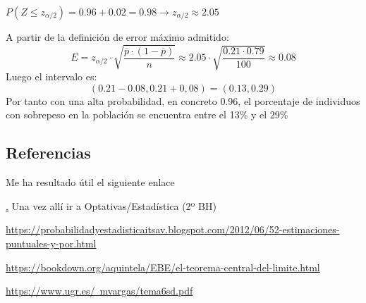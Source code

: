 $P\left(Z \leqslant z_{\alpha / 2} \right)= 0.96 + 0.02 = 0.98 \to z_{\alpha / 2} \approx 2.05$
 
A partir de la definición de error máximo admitido:
$$E=z_{\alpha / 2}\cdot \sqrt{\frac{\overline{p}\cdot\left(1-\overline{p} \right)}{n}}\approx 2.05 \cdot \sqrt{\frac{0.21\cdot 0.79}{100}}\approx 0.08$$
Luego el intervalo es: \\ 
$$\left( 0.21 - 0.08 , 0.21 + 0,08 \right) = \left(0.13, 0.29 \right)
$$
Por tanto con una alta probabilidad, en concreto 0.96, el porcentaje de individuos con sobrepeso en la población se encuentra entre el 13\% y el 29\% 

\subsection{Referencias}
Me ha resultado útil el siguiente enlace 

\href{
}. Una vez allí ir a Optativas/Estadística (2º BH)

\href{https://probabilidadyestadisticaitsav.blogspot.com/2012/06/52-estimaciones-puntuales-y-por.html}{https://probabilidadyestadisticaitsav.blogspot.com/2012/06/52-estimaciones-puntuales-y-por.html}

\href{https://bookdown.org/aquintela/EBE/el-teorema-central-del-limite.html}{https://bookdown.org/aquintela/EBE/el-teorema-central-del-limite.html}

\href{https://www.ugr.es/~mvargas/tema6sd.pdf}{https://www.ugr.es/~mvargas/tema6sd.pdf}




